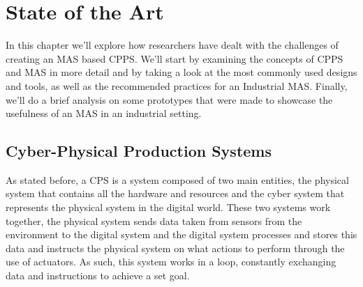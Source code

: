 

\glsresetall

\chapter{State of the Art}
\label{cha:state-of-the-art}

In this chapter we'll explore how researchers have dealt with the challenges of creating an \gls{MAS} based \gls{CPPS}. We'll start by  examining the concepts of \gls{CPPS} and \gls{MAS} in more detail and by taking a look at the most commonly used designs and tools, as well as the recommended practices for an Industrial \gls{MAS}. Finally, we'll do a brief analysis on some prototypes that were made to showcase the usefulness of an MAS in an industrial setting.

\section{Cyber-Physical Production Systems}
\label{sec:cyber-physical_production_systems}

As stated before, a \Gls{CPS} is a system composed of two main entities, the physical system that contains all the hardware and resources and the cyber system that represents the physical system in the digital world. These two systems work together, the physical system sends data taken from sensors from the environment to the digital system and the digital system processes and stores this data and instructs the physical system on what actions to perform through the use of actuators. As such, this system works in a loop, constantly exchanging data and instructions to achieve a set goal.\\

